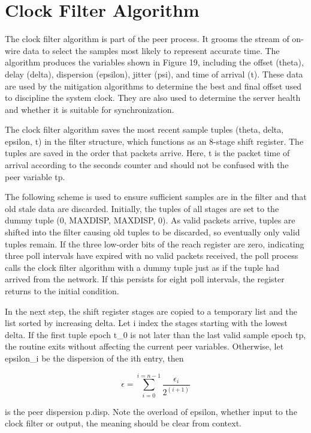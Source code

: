 \chapter{Clock Filter Algorithm}

The clock filter algorithm is part of the peer process.  It grooms
the stream of on-wire data to select the samples most likely to
represent accurate time.  The algorithm produces the variables shown
in Figure 19, including the offset (theta), delay (delta), dispersion
(epsilon), jitter (psi), and time of arrival (t).  These data are
used by the mitigation algorithms to determine the best and final
offset used to discipline the system clock.  They are also used to
determine the server health and whether it is suitable for
synchronization.

The clock filter algorithm saves the most recent sample tuples
(theta, delta, epsilon, t) in the filter structure, which functions
as an 8-stage shift register.  The tuples are saved in the order that
packets arrive.  Here, t is the packet time of arrival according to
the seconds counter and should not be confused with the peer variable
tp.

The following scheme is used to ensure sufficient samples are in the
filter and that old stale data are discarded.  Initially, the tuples
of all stages are set to the dummy tuple (0, MAXDISP, MAXDISP, 0).
As valid packets arrive, tuples are shifted into the filter causing
old tuples to be discarded, so eventually only valid tuples remain.
If the three low-order bits of the reach register are zero,
indicating three poll intervals have expired with no valid packets
received, the poll process calls the clock filter algorithm with a
dummy tuple just as if the tuple had arrived from the network.  If
this persists for eight poll intervals, the register returns to the
initial condition.

In the next step, the shift register stages are copied to a temporary
list and the list sorted by increasing delta.  Let i index the stages
starting with the lowest delta.  If the first tuple epoch t\_0 is not
later than the last valid sample epoch tp, the routine exits without
affecting the current peer variables.  Otherwise, let epsilon\_i be
the dispersion of the ith entry, then

$$
\epsilon = \sum^{i = n - 1}_{i = 0} \frac{\epsilon_i}{2^{(i + 1)}}
$$

is the peer dispersion p.disp.  Note the overload of epsilon, whether
input to the clock filter or output, the meaning should be clear from
context.

